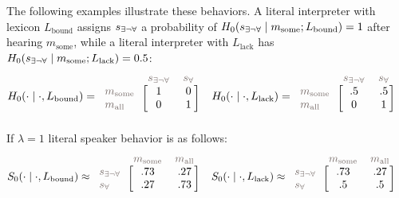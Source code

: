 \documentclass[a4paper, 11pt]{article}
\theoremstyle{Satz}
\newcommand{\state}{\ensuremath{s}\xspace}		%
\newcommand{\mystate}[1]{\ensuremath{\state_{\text{#1}}}\xspace} %
\newcommand{\mylang}[1]{\ensuremath{L_{\text{#1}}}\xspace} %
\newcommand{\messg}{\ensuremath{m}\xspace}		%
\newcommand{\mymessg}[1]{\ensuremath{\messg_{\text{#1}}}\xspace} %
\newcommand{\ssome}{\mystate{\ensuremath{\exists\neg\forall}}}
\newcommand{\sall}{\mystate{\ensuremath{\forall}}}
\newcommand{\msome}{\mymessg{some}}
\newcommand{\mall}{\mymessg{all}}
\newcommand{\Lbound}{\mylang{bound}}
\newcommand{\Llack}{\mylang{lack}}
\newcommand{\mygray}[1]{{\textcolor{mygray}{#1}}}
\begin{document}
The following examples illustrate these behaviors. A literal interpreter with lexicon $\Lbound$ assigns $\ssome$
a probability of $H_0(\ssome \mid \msome; \Lbound) = 1$ after hearing $\msome$, while a literal
interpreter with $\Llack$ has $H_0(\ssome \mid \msome; \Llack) = 0.5$:
\begin{align*}
  H_0(\cdot \mid \cdot, \Lbound) & = \begin{blockarray}{lcc}
    & \mygray{\ssome} & \mygray{\sall} \\
    \begin{block}{l[cc]}
      \mygray{\msome} & 1 & 0 \\
      \mygray{\mall}  & 0 & 1 \\
    \end{block}
  \end{blockarray} &
  H_0(\cdot \mid \cdot, \Llack) & = \begin{blockarray}{lcc}
    & \mygray{\ssome} & \mygray{\sall} \\
    \begin{block}{l[cc]}
      \mygray{\msome} & .5 & .5 \\
      \mygray{\mall}  & 0 & 1 \\
    \end{block}
  \end{blockarray} 
\end{align*}
If $\lambda = 1$ literal speaker behavior is as follows:
\begin{align*}
  S_0(\cdot \mid \cdot, \Lbound) & \approx \begin{blockarray}{lcc}
    & \mygray{\msome} & \mygray{\mall} \\
    \begin{block}{l[cc]}
      \mygray{\ssome} & .73 & .27 \\
      \mygray{\sall}  & .27 & .73 \\
    \end{block}
  \end{blockarray} &
  S_0(\cdot \mid \cdot, \Llack) & \approx \begin{blockarray}{lcc}
    & \mygray{\msome} & \mygray{\mall} \\
    \begin{block}{l[cc]}
      \mygray{\ssome} & .73 & .27 \\
      \mygray{\sall}  & .5 & .5 \\
    \end{block}
  \end{blockarray} 
\end{align*}
\end{document}
